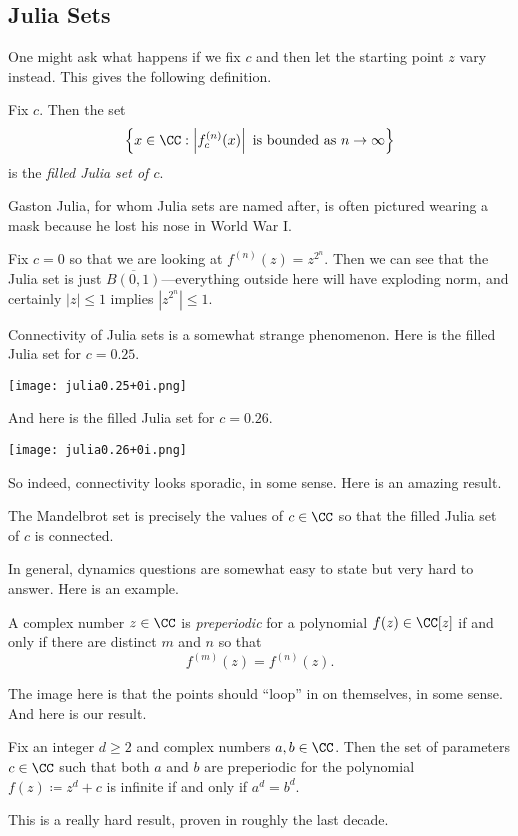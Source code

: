 \subsection{Julia Sets}
One might ask what happens if we fix $c$ and then let the starting point $z$ vary instead. This gives the following definition.
\begin{definition}
	Fix $c$. Then the set
	\[\left\{x\in\CC:\left|f^{(n)}_c(x)\right|\text{ is bounded as }n\to\infty\right\}\]
	is the \textit{filled Julia set of $c$}.
\end{definition}
\begin{remark}
	Gaston Julia, for whom Julia sets are named after, is often pictured wearing a mask because he lost his nose in World War I.
\end{remark}
\begin{example}
	Fix $c=0$ so that we are looking at $f^{(n)}(z)=z^{2^n}$. Then we can see that the Julia set is just $\overline{B(0,1)}$---everything outside here will have exploding norm, and certainly $|z|\le1$ implies $\left|z^{2^n}\right|\le1$.
\end{example}
Connectivity of Julia sets is a somewhat strange phenomenon. Here is the filled Julia set for $c=0.25$.
\begin{center}
	\texttt{[image: julia0.25+0i.png]}
\end{center}
And here is the filled Julia set for $c=0.26$.
\begin{center}
	\texttt{[image: julia0.26+0i.png]}
\end{center}
So indeed, connectivity looks sporadic, in some sense. Here is an amazing result.
\begin{theorem}
	The Mandelbrot set is precisely the values of $c\in\CC$ so that the filled Julia set of $c$ is connected.
\end{theorem}
In general, dynamics questions are somewhat easy to state but very hard to answer. Here is an example.
\begin{definition}
	A complex number $z\in\CC$ is \textit{preperiodic} for a polynomial $f(z)\in\CC[z]$ if and only if there are distinct $m$ and $n$ so that
	\[f^{(m)}(z)=f^{(n)}(z).\]
\end{definition}
The image here is that the points should ``loop'' in on themselves, in some sense. And here is our result.
\begin{theorem}
	Fix an integer $d\ge2$ and complex numbers $a,b\in\CC$. Then the set of parameters $c\in\CC$ such that both $a$ and $b$ are preperiodic for the polynomial $f(z)\coloneqq z^d+c$ is infinite if and only if $a^d=b^d$.
\end{theorem}
This is a really hard result, proven in roughly the last decade.